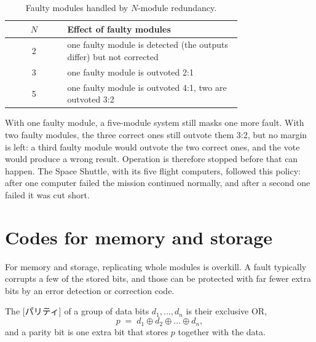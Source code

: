 \documentclass[../main.tex]{subfiles}
\begin{document}
\begin{table}[htbp]
  \centering\small
  \caption{Faulty modules handled by $N$-module redundancy.}
  \label{tab:l17-nmr}
  \begin{tabular}{@{}cp{0.75\linewidth}@{}}
    \toprule
    $N$ & Effect of faulty modules \\
    \midrule
    2 & one faulty module is detected (the outputs differ) but not corrected \\
    3 & one faulty module is outvoted 2:1 \\
    5 & one faulty module is outvoted 4:1, two are outvoted 3:2 \\
    \bottomrule
  \end{tabular}
\end{table}

With one faulty module, a five-module system still masks one more fault.
With two faulty modules, the three correct ones still outvote them 3:2, but
no margin is left: a third faulty module would outvote the two correct ones,
and the vote would produce a wrong result.  Operation is therefore stopped
before that can happen.  The Space Shuttle, with its five flight computers,
followed this policy: after one computer failed the mission continued
normally, and after a second one failed it was cut
short.

\section{Codes for memory and storage}
\label{sec:l17-codes}

For memory and storage, replicating whole modules is overkill.  A fault typically corrupts a few of the
stored bits, and those can be protected with far fewer extra bits by an
error detection or correction code.

\begin{definition}[Parity]
  The [パリティ] of a group of data bits $d_1,\dots,d_n$ is
  their exclusive OR,
  \begin{equation}
    p \;=\; d_1 \oplus d_2 \oplus \dots \oplus d_n ,
    \label{eq:l17-parity}
  \end{equation}
  and a parity bit is one extra bit that stores $p$ together with the data.
\end{definition}
\end{document}
